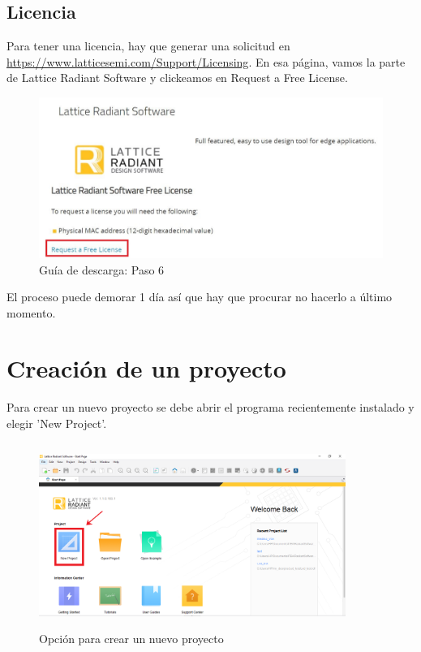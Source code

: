 \documentclass{article}
\begin{document}
\subsection{Licencia}
Para tener una licencia, hay que generar una solicitud en
\href{https://www.latticesemi.com/Support/Licensing}{https://www.latticesemi.com/Support/Licensing}.
En esa página, vamos la parte de Lattice Radiant Software y clickeamos en Request a Free License.

\begin{figure}[H]
\centering
\includegraphics[width=1\linewidth]{Imagenes/6.JPG}
\caption{Guía de descarga: Paso 6}
\label{fig:step6}
\end{figure}

El proceso puede demorar 1 día así que hay que procurar no hacerlo a último momento.

\section{Creación de un proyecto}
	Para crear un nuevo proyecto se debe abrir el programa recientemente instalado y elegir 'New Project'.
	\begin{figure}[H]
	\centering
	\includegraphics[height=6cm,width=10cm]{Imagenes/NewProj.png}
	\caption{Opción para crear un nuevo proyecto}
	\end{figure}
	
\end{document}
